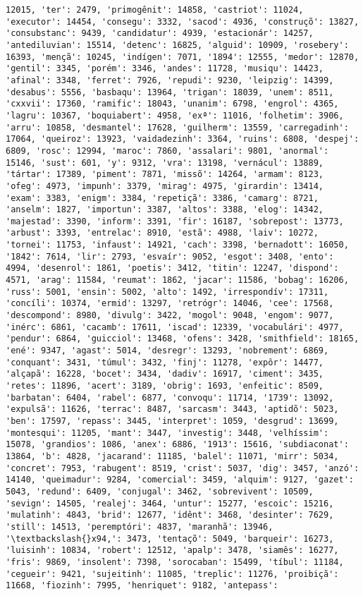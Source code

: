 \begin{Verbatim}[commandchars=\\\{\}]
12015, 'ter': 2479, 'primogênit': 14858, 'castriot': 11024, 'executor': 14454, 'consegu': 3332, 'sacod': 4936, 'construçõ': 13827, 'consubstanc': 9439, 'candidatur': 4939, 'estacionár': 14257, 'antediluvian': 15514, 'detenc': 16825, 'alguid': 10909, 'rosebery': 16393, 'mençã': 10245, 'indígen': 7071, '1894': 12555, 'medor': 12870, 'gentil': 3345, 'porém': 3346, 'andes': 11728, 'musiqu': 14423, 'afinal': 3348, 'ferret': 7926, 'repudi': 9230, 'leipzig': 14399, 'desabus': 5556, 'basbaqu': 13964, 'trigan': 18039, 'unem': 8511, 'cxxvii': 17360, 'ramific': 18043, 'unanim': 6798, 'engrol': 4365, 'lagru': 10367, 'boquiabert': 4958, 'exª': 11016, 'folhetim': 3906, 'arru': 10858, 'desmantel': 17628, 'guilherm': 13559, 'carregadinh': 17064, 'queiroz': 13923, 'vaidadezinh': 3364, 'ruins': 6808, 'despej': 6809, 'rosc': 12994, 'maroc': 7860, 'assalari': 9801, 'anormal': 15146, 'sust': 601, 'y': 9312, 'vra': 13198, 'vernácul': 13889, 'tártar': 17389, 'piment': 7871, 'missõ': 14264, 'armam': 8123, 'ofeg': 4973, 'impunh': 3379, 'mirag': 4975, 'girardin': 13414, 'exam': 3383, 'enigm': 3384, 'repetiçã': 3386, 'camarg': 8721, 'anselm': 1827, 'importun': 3387, 'altos': 3388, 'elog': 14342, 'majestad': 3390, 'inform': 3391, 'fir': 16187, 'sobrepost': 13773, 'arbust': 3393, 'entrelac': 8910, 'estã': 4988, 'laiv': 10272, 'tornei': 11753, 'infaust': 14921, 'cach': 3398, 'bernadott': 16050, '1842': 7614, 'lir': 2793, 'esvaír': 9052, 'esgot': 3408, 'ento': 4994, 'desenrol': 1861, 'poetis': 3412, 'titin': 12247, 'dispond': 4571, 'arag': 11584, 'reumat': 1862, 'jacar': 11586, 'bobag': 16206, 'russ': 5001, 'ensin': 5002, 'alto': 1492, 'irrespondív': 17311, 'concíli': 10374, 'ermid': 13297, 'retrógr': 14046, 'cee': 17568, 'descompond': 8980, 'divulg': 3422, 'mogol': 9048, 'engom': 9077, 'inérc': 6861, 'cacamb': 17611, 'iscad': 12339, 'vocabulári': 4977, 'pendur': 6864, 'guicciol': 13468, 'ofens': 3428, 'smithfield': 18165, 'ené': 9347, 'agast': 5014, 'desregr': 13293, 'nobrement': 6869, 'conquant': 3431, 'túmul': 3432, 'finj': 11278, 'expôr': 14477, 'alçapã': 16228, 'bocet': 3434, 'dadiv': 16917, 'ciment': 3435, 'retes': 11896, 'acert': 3189, 'obrig': 1693, 'enfeitic': 8509, 'barbatan': 6404, 'rabel': 6877, 'convoqu': 11714, '1739': 13092, 'expulsã': 11626, 'terrac': 8487, 'sarcasm': 3443, 'aptidõ': 5023, 'ben': 17597, 'repass': 3445, 'interpret': 1059, 'desgrud': 13699, 'montesqui': 11205, 'mant': 3447, 'investig': 3448, 'velhíssim': 15078, 'grandios': 1086, 'anex': 6886, '1913': 15616, 'subdiaconat': 13864, 'b': 4828, 'jacarand': 11185, 'balel': 11071, 'mirr': 5034, 'concret': 7953, 'rabugent': 8519, 'crist': 5037, 'dig': 3457, 'anzó': 14140, 'queimadur': 9284, 'comercial': 3459, 'alquim': 9127, 'gazet': 5043, 'redund': 6409, 'conjugal': 3462, 'sobrevivent': 10509, 'sevign': 14505, 'realej': 3464, 'untur': 15277, 'escoic': 15216, 'mulatinh': 4843, 'brid': 12677, 'idênt': 3468, 'desinter': 7629, 'still': 14513, 'peremptóri': 4837, 'maranhã': 13946, '\textbackslash{}x94,': 3473, 'tentaçõ': 5049, 'barqueir': 16273, 'luisinh': 10834, 'robert': 12512, 'apalp': 3478, 'siamês': 16277, 'fris': 9869, 'insolent': 7398, 'sorocaban': 15499, 'tíbul': 11184, 'cegueir': 9421, 'sujeitinh': 11085, 'treplic': 11276, 'proibiçã': 11668, 'fiozinh': 7995, 'henriquet': 9182, 'antepass': 
\end{Verbatim}
